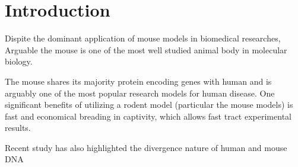 \section{Introduction}

Dispite the dominant application of mouse models in biomedical researches, Arguable the mouse is one of the most well studied animal body in molecular biology. 

The mouse shares its majority protein encoding genes with human and is arguably one of the most popular research models for human disease. One significant benefits of utilizing a rodent model (particular the mouse models) is fast and economical breading in captivity, which allows fast tract experimental results. \cite{Vandamme_2014}

Recent study has also highlighted the divergence nature of human and mouse DNA 